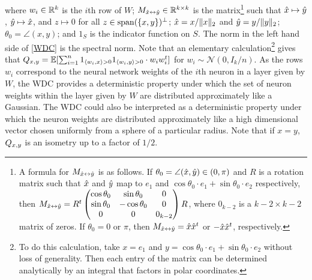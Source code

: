 where $w_i \in \mathbb{R}^k$ is the $i$th row of $W$; $M_{\hat{x} \leftrightarrow \hat{y}} \in \mathbb{R}^{k \times k}$ is the matrix\footnote{A formula for $M_{\hat{x} \leftrightarrow \hat{y}}$ is as follows.  If $\theta_0 = \angle(\hat{x}, \hat{y}) \in (0, \pi)$ and $R$ is a rotation matrix such that $\hat{x}$ and $\hat{y}$ map to $e_1$ and $\cos \theta_0 \cdot e_1 + \sin \theta_0 \cdot e_2$ respectively, then $M_{\hat{x} \leftrightarrow \hat{y}} = R^t \begin{pmatrix} \cos \theta_0 & \sin \theta_0 & 0 \\ \sin \theta_0 & - \cos \theta_0 & 0 \\ 0 & 0 & 0_{k-2} \end{pmatrix} R$, where $0_{k-2}$ is a $k-2 \times k-2$ matrix of zeros.  If $\theta_0 = 0$ or $\pi$, then $M_{\hat{x} \leftrightarrow \hat{y}} = \hat{x} \hat{x}^t$ or $- \hat{x} \hat{x}^t$, respectively.} such that $\hat{x} \mapsto \hat{y}$, $\hat{y} \mapsto \hat{x}$, and $z \mapsto 0$ for all $z \in \operatorname{span}(\{x,y\})^\perp$;  $\hat{x} = x/\|x\|_2$  and $\hat{y} = y /\|y\|_2$;  $\theta_0 = \angle(x, y)$; and $1_S$ is the indicator function on $S$.  The norm in the left hand side of \eqref{WDC} is the spectral norm.  Note that an elementary calculation\footnote{To do this calculation, take $x=e_1$ and $y = \cos \theta_0\cdot e_1 + \sin \theta_0 \cdot e_2$ without loss of generality.  Then each entry of the matrix can be determined analytically by an integral that factors in polar coordinates.} gives that $\Qxy = \E[\sum_{i=1}^n 1_{\innerprod{w_i}{x}>0} 1_{\innerprod{w_i}{y}>0} \cdot w_i w_i^t ]$ for $w_i \sim \mathcal{N}(0, I_k/n)$.  As the rows $w_i$ correspond to the neural network weights of the $i$th neuron in a layer given by $W$, the WDC provides a deterministic property under which the set of neuron weights within the layer given by $W$ are distributed approximately like a Gaussian.  The WDC could also be interpreted as a deterministic property under which the neuron weights are distributed approximately like a high dimensional vector chosen uniformly from a sphere of a particular radius.  Note that if $x=y$, $Q_{x,y}$ is an isometry up to a factor of $1/2$.
